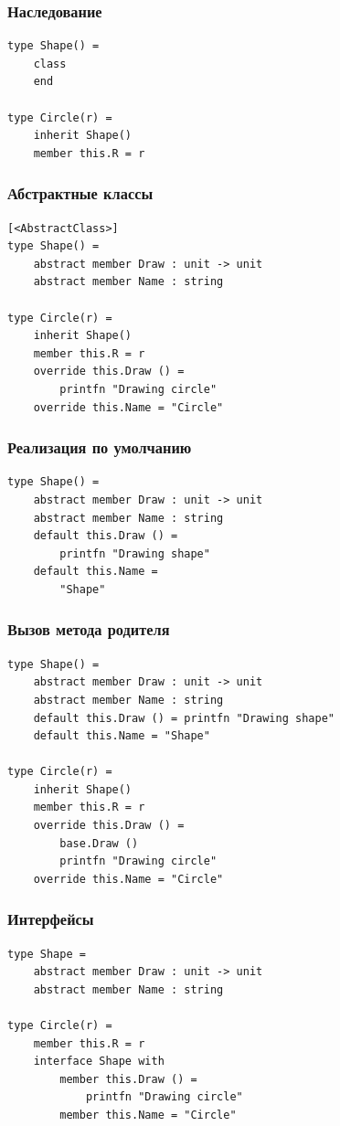 \documentclass{../../slides-style}
\begin{document}
    \begin{frame}[fragile]
        \frametitle{Наследование}
        \begin{verbatim}
type Shape() =
    class
    end

type Circle(r) =
    inherit Shape()
    member this.R = r
        \end{verbatim}
    \end{frame}

    \begin{frame}[fragile]
        \frametitle{Абстрактные классы}
        \begin{verbatim}
[<AbstractClass>]
type Shape() =
    abstract member Draw : unit -> unit
    abstract member Name : string

type Circle(r) =
    inherit Shape()
    member this.R = r
    override this.Draw () = 
        printfn "Drawing circle"
    override this.Name = "Circle"
        \end{verbatim}
    \end{frame}

    \begin{frame}[fragile]
        \frametitle{Реализация по умолчанию}
        \begin{verbatim}
type Shape() =
    abstract member Draw : unit -> unit
    abstract member Name : string
    default this.Draw () =
        printfn "Drawing shape"
    default this.Name =
        "Shape"
        \end{verbatim}
    \end{frame}

    \begin{frame}[fragile]
        \frametitle{Вызов метода родителя}
        \begin{verbatim}
type Shape() =
    abstract member Draw : unit -> unit
    abstract member Name : string
    default this.Draw () = printfn "Drawing shape"
    default this.Name = "Shape"

type Circle(r) =
    inherit Shape()
    member this.R = r
    override this.Draw () = 
        base.Draw ()
        printfn "Drawing circle"
    override this.Name = "Circle"
        \end{verbatim}
    \end{frame}

    \begin{frame}[fragile]
        \frametitle{Интерфейсы}
        \begin{verbatim}
type Shape =
    abstract member Draw : unit -> unit
    abstract member Name : string

type Circle(r) =
    member this.R = r
    interface Shape with
        member this.Draw () = 
            printfn "Drawing circle"
        member this.Name = "Circle"
        \end{verbatim}
    \end{frame}
\end{document}
